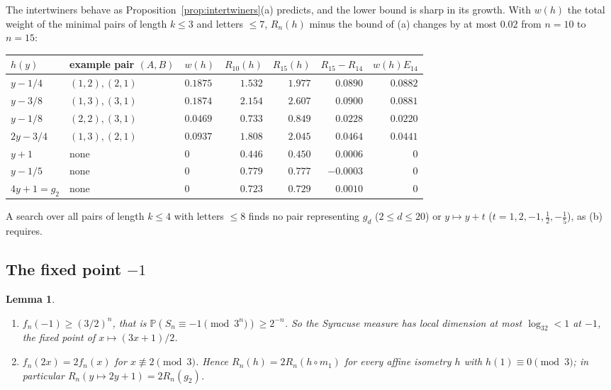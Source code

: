 \documentclass[11pt]{article}
\newtheorem{lemma}[theorem]{Lemma}
\theoremstyle{remark}
\newcommand{\Prob}{\mathbb P}
\begin{document}
The intertwiners behave as Proposition~\ref{prop:intertwiners}(a) predicts, and the lower bound is sharp in its growth. With $w(h)$ the total weight of the minimal pairs of length $k\le3$ and letters $\le7$, $R_n(h)$ minus the bound of (a) changes by at most $0.02$ from $n=10$ to $n=15$:
\begin{center}
\begin{tabular}{@{}lllrrrr@{}}
\toprule
$h(y)$ & example pair $(A,B)$ & $w(h)$ & $R_{10}(h)$ & $R_{15}(h)$ & $R_{15}-R_{14}$ & $w(h)E_{14}$\\
\midrule
$y-1/4$ & $(1,2),(2,1)$ & $0.1875$ & $1.532$ & $1.977$ & $0.0890$ & $0.0882$\\
$y-3/8$ & $(1,3),(3,1)$ & $0.1874$ & $2.154$ & $2.607$ & $0.0900$ & $0.0881$\\
$y-1/8$ & $(2,2),(3,1)$ & $0.0469$ & $0.733$ & $0.849$ & $0.0228$ & $0.0220$\\
$2y-3/4$ & $(1,3),(2,1)$ & $0.0937$ & $1.808$ & $2.045$ & $0.0464$ & $0.0441$\\
\midrule
$y+1$ & none & $0$ & $0.446$ & $0.450$ & $0.0006$ & $0$\\
$y-1/5$ & none & $0$ & $0.779$ & $0.777$ & $-0.0003$ & $0$\\
$4y+1=g_2$ & none & $0$ & $0.723$ & $0.729$ & $0.0010$ & $0$\\
\bottomrule
\end{tabular}
\end{center}
A search over all pairs of length $k\le4$ with letters $\le8$ finds no pair representing $g_d$ ($2\le d\le20$) or $y\mapsto y+t$ ($t=1,2,-1,\frac12,-\frac15$), as (b) requires.

\subsection*{The fixed point $-1$}
\begin{lemma}\label{lem:minusone}
\leavevmode\begin{enumerate}
\item[(a)] $f_n(-1)\ge(3/2)^n$, that is $\Prob(S_n\equiv-1\pmod{3^n})\ge2^{-n}$. So the Syracuse measure has local dimension at most $\log_32<1$ at $-1$, the fixed point of $x\mapsto(3x+1)/2$.
\item[(b)] $f_n(2x)=2f_n(x)$ for $x\not\equiv2\pmod3$. Hence $R_n(h)=2R_n(h\circ m_1)$ for every affine isometry $h$ with $h(1)\equiv0\pmod3$; in particular $R_n(y\mapsto2y+1)=2R_n(g_2)$.
\end{enumerate}
\end{lemma}
\end{document}
